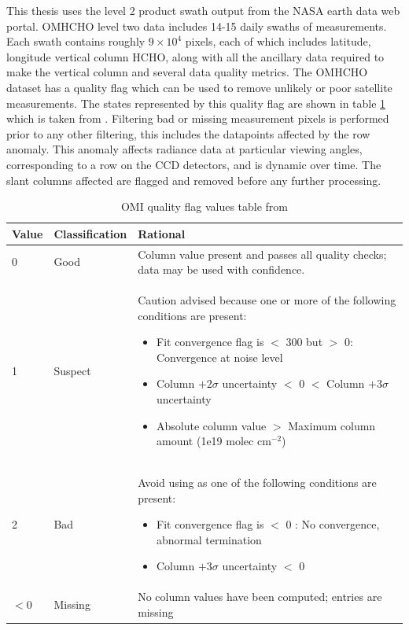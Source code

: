   
  This thesis uses the level 2 product swath output from the NASA earth data web portal.
  OMHCHO level two data includes 14-15 daily swaths of measurements.
  Each swath contains roughly $9 \times 10^4$ pixels, each of which includes latitude, longitude vertical column HCHO, along with all the ancillary data required to make the vertical column and several data quality metrics.
  The OMHCHO dataset has a quality flag which can be used to remove unlikely or poor satellite measurements.
  The states represented by this quality flag are shown in table \ref{Model:Datasets:OMHCHO:tab_qflag} which is taken from \textcite{Kurosu2014}.
  Filtering bad or missing measurement pixels is performed prior to any other filtering, this includes the datapoints affected by the row anomaly.
  This anomaly \parencite{rowanomaly_url} affects radiance data at particular viewing angles, corresponding to a row on the CCD detectors, and is dynamic over time.
  The slant columns affected are flagged and removed before any further processing.
  
  
  \begin{table}
    \caption{OMI quality flag values table from \textcite{Kurosu2014}}
    \begin{tabular}{  l  l  p{10cm} }
      \hline
      \textbf{Value} & \textbf{Classification} & \textbf{Rational} 
      \\ \hline
      0 & Good & Column value present and passes all quality checks; data may be used with confidence. 
      \\ \hline
      1 & Suspect & Caution advised because one or more of the following conditions are present: 
      \begin{itemize}
        \item Fit convergence flag is $<$ 300 but $>$ 0: Convergence at noise level
        \item Column $+ 2 \sigma$ uncertainty $<$ 0 $<$ Column $ + 3 \sigma $ uncertainty
        \item Absolute column value $>$ Maximum column amount (1e19 molec cm$^{-2}$)
      \end{itemize}
      \\ \hline
      2 & Bad & Avoid using as one of the following conditions are present: 
      \begin{itemize}
        \item Fit convergence flag is $<$ 0 : No convergence, abnormal termination
        \item Column $+ 3 \sigma$ uncertainty $<$ 0
      \end{itemize}
      \\ \hline
      $<0$ & Missing & No column values have been computed; entries are missing
      \\ \hline
    \end{tabular}
    \label{Model:Datasets:OMHCHO:tab_qflag}
  \end{table}
  
